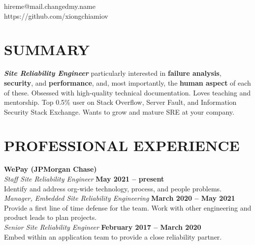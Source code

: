 \documentclass[margin,line]{resume}
\begin{document}
{
    \hfill hireme@mail.changedmy.name       \vspace{0mm}\\\vspace{0mm}%
    \hfill https://github.com/xiongchiamiov \vspace{0mm}\\\vspace{-9mm}%
}

\begin{resume}

    \vspace{-3mm}

    \section{\mysidestyle \textbf{\large{S}\small{UMMARY}}}

    \textbf{\textsl{Site Reliability Engineer}} particularly interested in \textbf{failure analysis}, \textbf{security}, and \textbf{performance}, and, most importantly, the \textbf{human aspect} of each of these.  Obsessed with high-quality technical documentation.  Loves teaching and mentorship.  Top 0.5\% user on Stack Overflow, Server Fault, and Information Security Stack Exchange.  Wants to grow and mature SRE at your company.

    \vspace{-1mm}

\sectionline

    \section{\mysidestyle \textbf{\large{P}\small{ROFESSIONAL} \large{E}\small{XPERIENCE}}}
    
    \textbf{\listing WePay (JPMorgan Chase)} \vspace{2mm}\\\vspace{1mm}%
    \textsl{Staff Site Reliability Engineer} \hfill \textbf{May 2021 -- present}\\
    Identify and address org-wide technology, process, and people problems.\\
    \textsl{Manager, Embedded Site Reliability Engineering} \hfill \textbf{March 2020 -- May 2021}\\
    Provide a first line of time defense for the team.  Work with other engineering and product leads to plan projects.\\
    \textsl{Senior Site Reliability Engineer} \hfill \textbf{February 2017 -- March 2020}\\
    Embed within an application team to provide a close reliability partner.


\end{resume}
\end{document}
